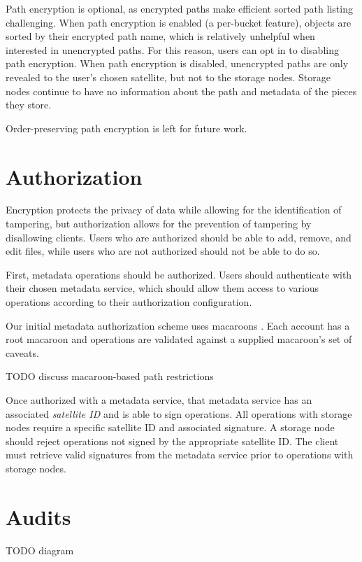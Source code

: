 \documentclass[11pt,fleqn,openany]{book}
\newcommand{\todo}[1]{{\color{red} TODO #1 }}
\begin{document}
Path encryption is optional, as encrypted paths make efficient sorted path
listing challenging. When path encryption is enabled (a per-bucket feature),
objects are sorted by their encrypted path name, which is relatively unhelpful
when interested in unencrypted paths. For this reason, users can opt in to
disabling path encryption. When path encryption is disabled, unencrypted paths
are only revealed to the user's chosen satellite, but not to the storage
nodes. Storage nodes continue to have no information about the path and
metadata of the pieces they store.

Order-preserving path encryption is left for future work.

\section{Authorization}\label{sec:concrete-authorization}

Encryption protects the privacy of data while allowing for the identification
of tampering, but authorization allows for the prevention of tampering by
disallowing clients. Users who are authorized should be able to add, remove,
and edit files, while users who are not authorized should not be able to do so.

First, metadata operations should be authorized. Users should authenticate with
their chosen metadata service, which should allow them
access to various operations
according to their authorization configuration.

Our initial metadata authorization scheme uses macaroons \cite{macaroons}.
Each account has a root macaroon and operations are validated against a supplied
macaroon's set of caveats.

\todo{discuss macaroon-based path restrictions}

Once authorized with a metadata service, that metadata service has an associated
{\em satellite ID} and is able to sign operations. All
operations with storage nodes require a specific satellite ID and associated
signature. A storage node should reject operations not signed by the appropriate
satellite ID. The client must retrieve valid signatures from the metadata
service prior to operations with storage nodes.

\section{Audits}\label{sec:concrete-audits}

\todo{diagram}
\end{document}
